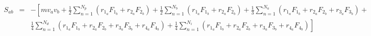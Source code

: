 \documentclass[12pt]{article}
\begin{document}
\begin{eqnarray*}
S_{ab} & = & - \left[ m v_a v_b + 
   \frac{1}{2} \sum_{n = 1}^{N_p} (r_{1_a} F_{1_b} + r_{2_a} F_{2_b}) +
   \frac{1}{2} \sum_{n = 1}^{N_b} (r_{1_a} F_{1_b} + r_{2_a} F_{2_b}) + 
   \frac{1}{3} \sum_{n = 1}^{N_a} (r_{1_a} F_{1_b} + r_{2_a} F_{2_b} + 
                                   r_{3_a} F_{3_b}) + \right. \\
&& \left. \frac{1}{4} \sum_{n = 1}^{N_d} (r_{1_a} F_{1_b} + r_{2_a} F_{2_b} + 
				   r_{3_a} F_{3_b} + r_{4_a} F_{4_b}) + 
   \frac{1}{4} \sum_{n = 1}^{N_i} (r_{1_a} F_{1_b} + r_{2_a} F_{2_b} + 
                                   r_{3_a} F_{3_b} + r_{4_a} F_{4_b})
   \right]
\end{eqnarray*}
\end{document}
